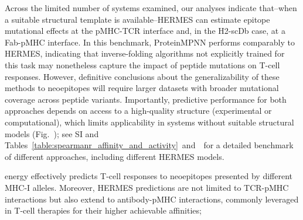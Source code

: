 Across the limited number of systems examined, our analyses indicate that--when a suitable
structural template is available--HERMES can estimate epitope mutational effects at the pMHC-TCR
interface and, in the H2-scDb case, at a Fab-pMHC interface. In this benchmark, ProteinMPNN performs
comparably to HERMES, indicating that inverse-folding algorithms not explicitly trained for this
task may nonetheless capture the impact of peptide mutations on T-cell responses. However,
definitive conclusions about the generalizability of these methods to neoepitopes will require
larger datasets with broader mutational coverage across peptide variants. Importantly, predictive
performance for both approaches depends on access to a high-quality structure (experimental or
computational), which limits applicability in systems without suitable structural models
(Fig.~\AfScoringResultsFigure); 
see SI and Tables~\ref{table:spearmanr_affinity_and_activity}~and~\SpearmanrActivityTable~for a
detailed benchmark of different approaches, including different HERMES models.


energy effectively predicts T-cell responses to {neoepitopes} presented by different MHC-I alleles.
Moreover, HERMES predictions are not limited to TCR-pMHC interactions but also extend to
antibody-pMHC interactions, commonly leveraged in T-cell therapies for their higher achievable
affinities;


